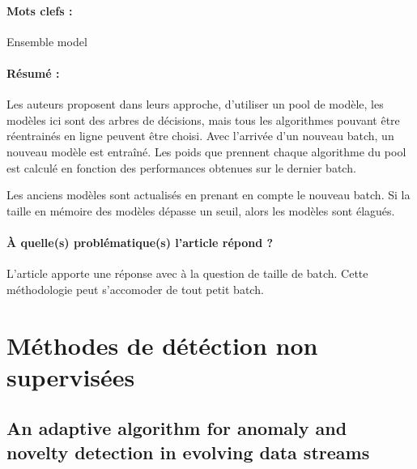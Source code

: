 \documentclass[11pt,a4paper]{report}
\begin{document}
\paragraph{Mots clefs :} Ensemble model

\paragraph{Résumé :} Les auteurs proposent dans leurs approche, d'utiliser un pool de modèle, les modèles ici sont des arbres de décisions, mais tous les algorithmes pouvant être réentrainés en ligne peuvent être choisi. Avec l'arrivée d'un nouveau batch, un nouveau modèle est entraîné. Les poids que prennent chaque algorithme du pool est calculé en fonction des performances obtenues sur le dernier batch. 

Les anciens modèles sont actualisés en prenant en compte le nouveau batch. Si la taille en mémoire des modèles dépasse un seuil, alors les modèles sont élagués.

\paragraph{À quelle(s) problématique(s) l'article répond ?} L'article apporte une réponse avec à la question de taille de batch. Cette méthodologie peut s'accomoder de tout petit batch.














\newpage



















\section{Méthodes de détéction non supervisées}

\subsection{An adaptive algorithm for anomaly and novelty detection in evolving data streams}
\end{document}

